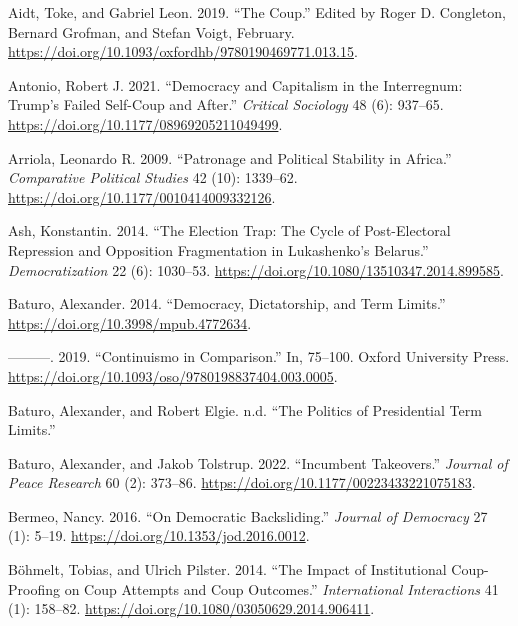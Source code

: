 \documentclass[
  12pt,
]{report}
\newlength{\cslhangindent}
\newenvironment{CSLReferences}[2] %
 {\begin{list}{}{%
  \setlength{\itemindent}{0pt}
  \setlength{\leftmargin}{0pt}
  \setlength{\parsep}{0pt}
  \ifodd #1
   \setlength{\leftmargin}{\cslhangindent}
   \setlength{\itemindent}{-1\cslhangindent}
  \fi
  \setlength{\itemsep}{#2\baselineskip}}}
 {\end{list}}
\begin{document}
\label{refs}
\begin{CSLReferences}{1}{0}
Aidt, Toke, and Gabriel Leon. 2019. {``The Coup.''} Edited by Roger D.
Congleton, Bernard Grofman, and Stefan Voigt, February.
\url{https://doi.org/10.1093/oxfordhb/9780190469771.013.15}.

Antonio, Robert J. 2021. {``Democracy and Capitalism in the Interregnum:
Trump{'}s Failed Self-Coup and After.''} \emph{Critical Sociology} 48
(6): 937--65. \url{https://doi.org/10.1177/08969205211049499}.

Arriola, Leonardo R. 2009. {``Patronage and Political Stability in
Africa.''} \emph{Comparative Political Studies} 42 (10): 1339--62.
\url{https://doi.org/10.1177/0010414009332126}.

Ash, Konstantin. 2014. {``The Election Trap: The Cycle of Post-Electoral
Repression and Opposition Fragmentation in Lukashenko's Belarus.''}
\emph{Democratization} 22 (6): 1030--53.
\url{https://doi.org/10.1080/13510347.2014.899585}.

Baturo, Alexander. 2014. {``Democracy, Dictatorship, and Term Limits.''}
\url{https://doi.org/10.3998/mpub.4772634}.

---------. 2019. {``Continuismo in Comparison.''} In, 75--100. Oxford
University Press.
\url{https://doi.org/10.1093/oso/9780198837404.003.0005}.

Baturo, Alexander, and Robert Elgie. n.d. {``The Politics of
Presidential Term Limits.''}

Baturo, Alexander, and Jakob Tolstrup. 2022. {``Incumbent Takeovers.''}
\emph{Journal of Peace Research} 60 (2): 373--86.
\url{https://doi.org/10.1177/00223433221075183}.

Bermeo, Nancy. 2016. {``On Democratic Backsliding.''} \emph{Journal of
Democracy} 27 (1): 5--19. \url{https://doi.org/10.1353/jod.2016.0012}.

Böhmelt, Tobias, and Ulrich Pilster. 2014. {``The Impact of
Institutional Coup-Proofing on Coup Attempts and Coup Outcomes.''}
\emph{International Interactions} 41 (1): 158--82.
\url{https://doi.org/10.1080/03050629.2014.906411}.


\end{CSLReferences}
\end{document}
